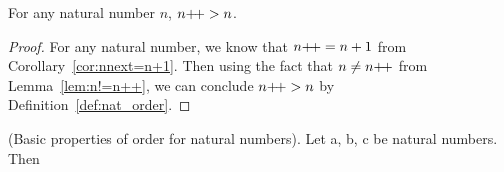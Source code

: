 \begin{subsequence}
    
    \begin{lemma}
        For any natural number $n$, $n\operatorname{\!+\!+} > n$.\label{lem:nnext>n}
    \end{lemma}  
    \begin{proof}
        For any natural number, we know that $n\operatorname{\!+\!+}=n+1$ from Corollary~\ref{cor:nnext=n+1}. Then using the fact that $n\neq n\operatorname{\!+\!+}$ from Lemma~\ref{lem:n!=n++}, we can conclude $n\operatorname{\!+\!+} > n$ by Definition~\ref{def:nat_order}.
    \end{proof}  
\end{subsequence}
\begin{proposition}
    \textup{ (Basic properties of order for natural numbers)}. Let a, b, c be natural numbers. Then
\end{proposition}
